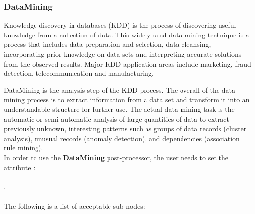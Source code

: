 \subsubsection{DataMining}
\label{subsubsec:DataMining}

Knowledge discovery in databases (KDD) is the process of discovering
 useful knowledge from a collection of data. This widely used data
mining technique is a process that includes data preparation and
selection, data cleansing, incorporating prior knowledge on data
sets and interpreting accurate solutions from the observed results.
Major KDD application areas include marketing, fraud detection,
telecommunication and manufacturing.

DataMining is the analysis step of the KDD process. The overall of
the data mining process is to extract information from a data set
and transform it into an understandable structure for further use.
The actual data mining task is the
automatic or semi-automatic analysis of large quantities of data
to extract previously unknown, interesting patterns such as groups
 of data records (cluster analysis), unusual records (anomaly
detection), and dependencies (association rule mining).
\\
%
In order to use the \textbf{DataMining} post-processor, the user
needs to set the attribute : \\
\\
. \\
\\
The following is a list of acceptable sub-nodes:
